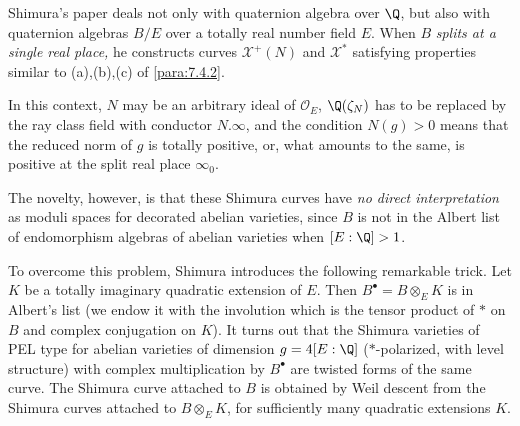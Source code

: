 \begin{para}\label{para:7.5.1}
 Shimura's paper \cite{shimura67:_const} deals not only with quaternion algebra
 over $\Q$, but also with quaternion algebras $B/E$ over a totally real
 number field $E$. When $B$ {\it splits at a single real place,} he
 constructs curves ${\mathcal{X}^+(N)}$ and ${\mathcal{X}^\ast}$
 satisfying properties similar to (a),(b),(c) of \ref{para:7.4.2}.


 In this context, $N$ may be an arbitrary ideal of $\mathcal{O}_E$,
 $\Q(\zeta_N)$ has to be replaced by the ray class field with conductor
 $N.\infty$, and the condition $N(g)>0$ means that the reduced norm of
 $g$ is totally positive, or, what amounts to the same, is positive at
 the split real place $\infty_0$.
 
 The novelty, however, is that these Shimura curves have {\it no
 direct interpretation} as moduli spaces for
 decorated abelian varieties, since $B$ is not in the Albert list of
 endomorphism algebras of abelian varieties when $[E:\Q]>1$.


 To overcome this problem, Shimura introduces the following remarkable
 trick. Let $K$ be a totally imaginary quadratic extension of $E$. Then
 $B^\bullet =B\otimes_E K$ is in Albert's list (we endow it with the
 involution which is the tensor product of $\ast$ on $B$ and complex
 conjugation on $K$). It turns out that the Shimura varieties of PEL
 type for abelian varieties of dimension $g=4[E:\Q]$ ($\ast$-polarized,
 with level structure) with complex multiplication by $B^\bullet$ are
 twisted forms of the same curve. The Shimura curve attached to $B$ is
 obtained by Weil descent from the Shimura curves attached to
 $B\otimes_E K$, for sufficiently many quadratic extensions $K$.
\end{para}

